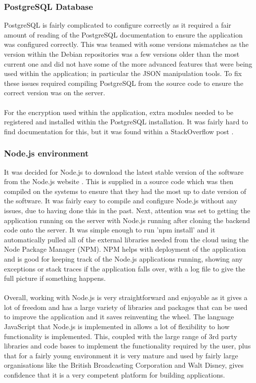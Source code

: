 \subsubsection{PostgreSQL Database}

PostgreSQL is fairly complicated to configure correctly as it required a fair amount of reading of the PostgreSQL documentation \cite{Postgres:APIDocumentation:2015:online} to ensure the application was configured correctly. This was teamed with some versions mismatches as the version within the Debian repositories was a few versions older than the most current one and did not have some of the more advanced features that were being used within the application; in particular the JSON manipulation tools. To fix these issues required compiling PostgreSQL from the source code to ensure the correct version was on the server.\\
\\
For the encryption used within the application, extra modules needed to be registered and installed within the PostgreSQL installation. It was fairly hard to find documentation for this, but it was found within a StackOverflow post \cite{se:howtoinstallpgcrypto:2011:online}. 

\subsubsection{Node.js environment}

It was decided for Node.js to download the latest stable version of the software from the Node.js website \cite{nodeteam:node:2015:online}. This is supplied in a source code which was then compiled on the systems to ensure that they had the most up to date version of the software. It was fairly easy to compile and configure Node.js without any issues, due to having done this in the past. Next, attention was set to getting the application running on the server with Node.js running after cloning the backend code onto the server. It was simple enough to run 'npm install' and it automatically pulled all of the external libraries needed from the cloud using the Node Package Manager (NPM). NPM helps with deployment of the application and is good for keeping track of the Node.js applications running, showing any exceptions or stack traces if the application falls over, with a log file to give the full picture if something happens.\\
\\
Overall, working with Node.js is very straightforward and enjoyable as it gives a lot of freedom and has a large variety of libraries and packages that can be used to improve the application and it saves reinventing the wheel. The language JavaScript that Node.js is implemented in allows a lot of flexibility to how functionality is implemented. This, coupled with the large range of 3rd party libraries and code bases to implement the functionality required by the user, plus that for a fairly young environment it is very mature and used by fairly large organisations like the British Broadcasting Corporation and Walt Disney, gives confidence that it is a very competent platform for building applications.

